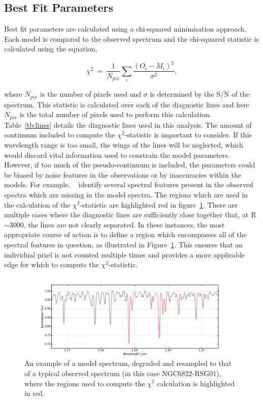 \documentclass[12pt]{article}
\begin{document}
\subsection{Best Fit Parameters} %
\label{sub:best_fit_parameters}

Best fit parameters are calculated using a chi-squared minimisation approach.
Each model is compared to the observed spectrum
and the chi-squared statistic is calculated using the equation,

\begin{equation}
    \chi^{2}~=~\frac{1}{N_{pix}}\sum\limits_{i}{\frac{(O_{i} - M_{i})^{2}}{\sigma^{2}}},
\end{equation}

where $N_{pix}$ is the number of pixels used and
$\sigma$ is determined by the S/N of the spectrum.
This statistic is calculated over each of the diagnostic lines and here $N_{pix}$ is the total number of pixels used to perform this calculation.
Table~\ref{tb:lines} details the diagnostic lines used in this analysis.
The amount of continuum included to compute the $\chi^{2}$-statistic is important to consider.
If this wavelength range is too small, the wings of the lines will be neglected,
which would discard vital information used to constrain the model parameters.
However, if too much of the pseudo-continuum is included, the parameters could be biased by noise features in the observations or by inaccuracies within the models.
For example,
~\cite{2014PhDT.........G} identify several spectral features present in the observed spectra which are missing in the model spectra.
The regions which are used in the calculation of the $\chi^{2}$-statistic are highlighted red in
figure~\ref{fig:lines}.
There are multiple cases where the diagnostic lines are sufficiently close together that, at R$\sim$3000,
the lines are not clearly separated.
In these instances, the most appropriate course of action is to define a region which encompasses all of the spectral features in question,
as illustrated in Figure~\ref{fig:lines}.
This ensures that an individual pixel is not counted multiple times and provides a more applicable edge for which to compute the $\chi^{2}$-statistic.

\begin{figure}
 \centering
 \includegraphics[width=\textwidth]{Diag-lines}
 \caption[Diagnostic lines]{
An example of a model spectrum, degraded and resampled to that of a typical observed spectrum (in this case NGC6822-RSG01), where the regions used to compute the $\chi^{2}$ calculation is highlighted in red.\label{fig:lines}
         }
\end{figure}
\end{document}
